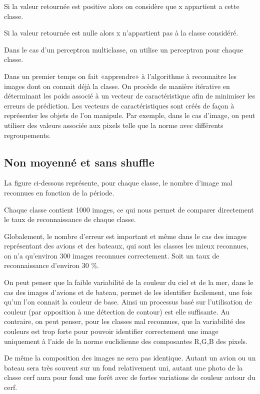Si la valeur retournée est positive alors on considère que x appartient a cette classe.

Si la valeur retournée est nulle alors x n'appartient pas à la classe considéré.

Dans le cas d'un perceptron multiclasse, on utilise un perceptron pour chaque classe.

Dans un premier temps on fait «apprendre» à l'algorithme à reconnaitre les images dont on connait déjà la classe. On procède de manière itérative en déterminant les poids associé à un vecteur de caractéristique afin de minimiser les erreurs de prédiction. Les vecteurs de caractéristiques sont créés de façon à représenter les objets de l'on manipule. Par exemple, dans le cas d'image, on peut utiliser des valeurs associée aux pixels telle que la norme avec différents regroupements.


\subsection{Non moyenné et sans shuffle}

La figure ci-dessous représente, pour chaque classe, le nombre d'image mal reconnues en fonction de la période.

Chaque classe contient 1000 images, ce qui nous permet de comparer directement le taux de reconnaissance de chaque classe.

Globalement, le nombre d'erreur est important et même dans le cas des images représentant des avions et des bateaux, qui sont les classes les mieux reconnues, on n'a qu'environ 300 images reconnues correctement. Soit un taux de reconnaissance d'environ 30 \%.

On peut penser que la faible variabilité de la couleur du ciel et de la mer, dans le cas des images d'avions et de bateau, permet de les identifier facilement, une fois qu'un l'on connait la couleur de base. Ainsi un processus basé sur l'utilisation de couleur (par opposition à une détection de contour) est elle suffisante. Au contraire, on peut penser, pour les classes mal reconnues, que la variabilité des couleurs est trop forte pour pouvoir identifier correctement une image uniquement à l'aide de la norme euclidienne des composantes R,G,B des pixels.

De même la composition des images ne sera pas identique. Autant un avion ou un bateau sera très souvent sur un fond relativement uni, autant une photo de la classe cerf aura pour fond une forêt avec de fortes variations de couleur autour du cerf. 

